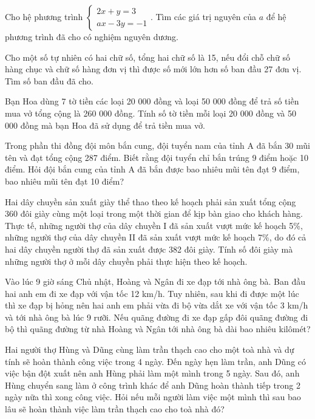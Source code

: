 \documentclass[%
    fontsize=12pt,%
    chapterprefix=false,%
    open=right,%
    twoside=false,%
    numbers=noenddot,%
    headings=optiontohead,%
    final,%
    DIV=15,%
    parskip=half %
]{scrbook}
\begin{document}
\begin{tuluan}
\item Cho hệ phương trình $ \begin{cases} 2x + y = 3 \\ ax - 3y = -1 \end{cases} $. Tìm các giá trị nguyên của $ a $ để hệ phương trình đã cho có nghiệm nguyên dương.

\item Cho một số tự nhiên có hai chữ số, tổng hai chữ số là 15, nếu đổi chỗ chữ số hàng chục và chữ số hàng đơn vị thì được số mới lớn hơn số ban đầu 27 đơn vị. Tìm số ban đầu đã cho.

\item Bạn Hoa dùng 7 tờ tiền các loại 20 000 đồng và loại 50 000 đồng để trả số tiền mua vở tổng cộng là 260 000 đồng. Tính số tờ tiền mỗi loại 20 000 đồng và 50 000 đồng mà bạn Hoa đã sử dụng để trả tiền mua vở.

\item Trong phần thi đồng đội môn bắn cung, đội tuyển nam của tỉnh A đã bắn 30 mũi tên và đạt tổng cộng 287 điểm. Biết rằng đội tuyển chỉ bắn trúng 9 điểm hoặc 10 điểm. Hỏi đội bắn cung của tỉnh A đã bắn được bao nhiêu mũi tên đạt 9 điểm, bao nhiêu mũi tên đạt 10 điểm?

\item Hai dây chuyền sản xuất giày thể thao theo kế hoạch phải sản xuất tổng cộng 360 đôi giày cùng một loại trong một thời gian để kịp bàn giao cho khách hàng. Thực tế, những người thợ của dây chuyền I đã sản xuất vượt mức kế hoạch 5\%, những người thợ của dây chuyền II đã sản xuất vượt mức kế hoạch 7\%, do đó cả hai dây chuyền người thợ đã sản xuất được 382 đôi giày. Tính số đôi giày mà những người thợ ở mỗi dây chuyền phải thực hiện theo kế hoạch.

\item Vào lúc 9 giờ sáng Chủ nhật, Hoàng và Ngân đi xe đạp tới nhà ông bà. Ban đầu hai anh em đi xe đạp với vận tốc 12 km/h. Tuy nhiên, sau khi đi được một lúc thì xe đạp bị hỏng nên hai anh em phải vừa đi bộ vừa dắt xe với vận tốc 3 km/h và tới nhà ông bà lúc 9 rưỡi. Nếu quãng đường đi xe đạp gấp đôi quãng đường đi bộ thì quãng đường từ nhà Hoàng và Ngân tới nhà ông bà dài bao nhiêu kilômét?

\item Hai người thợ Hùng và Dũng cùng làm trần thạch cao cho một toà nhà và dự tính sẽ hoàn thành công việc trong 4 ngày. Đến ngày hẹn làm trần, anh Dũng có việc bận đột xuất nên anh Hùng phải làm một mình trong 5 ngày. Sau đó, anh Hùng chuyển sang làm ở công trình khác để anh Dũng hoàn thành tiếp trong 2 ngày nữa thì xong công việc. Hỏi nếu mỗi người làm việc một mình thì sau bao lâu sẽ hoàn thành việc làm trần thạch cao cho toà nhà đó?


\end{tuluan}
\end{document}
